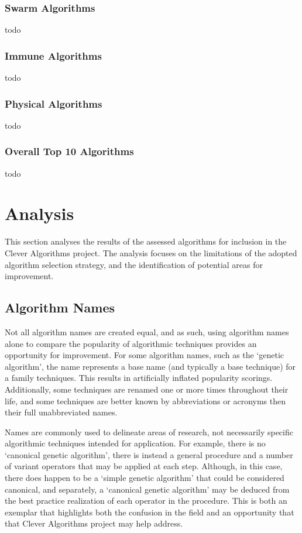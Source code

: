 \documentclass[a4paper, 11pt]{article}
\begin{document}
\subsubsection{Swarm Algorithms}
todo

\subsubsection{Immune Algorithms}
todo

\subsubsection{Physical Algorithms}
todo

\subsubsection{Overall Top 10 Algorithms}
todo

% 
% 
\section{Analysis}
\label{sec:analysis}
This section analyses the results of the assessed algorithms for inclusion in the Clever Algorithms project. The analysis focuses on the limitations of the adopted algorithm selection strategy, and the identification of potential areas for improvement.

\subsection{Algorithm Names}
Not all algorithm names are created equal, and as such, using algorithm names alone to compare the popularity of algorithmic techniques provides an opportunity for improvement. For some algorithm names, such as the `genetic algorithm', the name represents a base name (and typically a base technique) for a family techniques. This results in artificially inflated popularity scorings. Additionally, some techniques are renamed one or more times throughout their life, and some techniques are better known by abbreviations or acronyms then their full unabbreviated names.

Names are commonly used to delineate areas of research, not necessarily specific algorithmic techniques intended for application. For example, there is no `canonical genetic algorithm', there is instead a general procedure and a number of variant operators that may be applied at each step. Although, in this case, there does happen to be a `simple genetic algorithm' that could be considered canonical, and separately, a `canonical genetic algorithm' may be deduced from the best practice realization of each operator in the procedure. This is both an exemplar that highlights both the confusion in the field and an opportunity that that Clever Algorithms project may help address.
\end{document}
